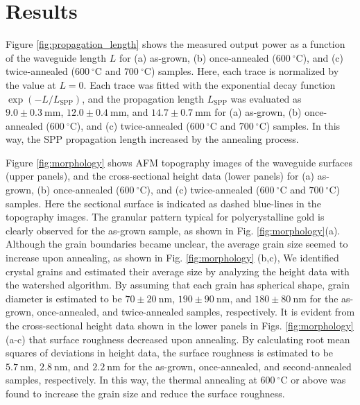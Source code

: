 \documentclass[aip,apl,reprint]{revtex4-1}
\begin{document}
\section{Results}
\label{sec:result}
Figure \ref{fig:propagation_length} shows the measured output power as a function of the waveguide length $L$ for (a) as-grown, (b) once-annealed ($600\:^\circ\mathrm{C}$), and (c) twice-annealed ($600\:^\circ\mathrm{C}$ and $700\:^\circ\mathrm{C}$) samples.
Here, each trace is normalized by the value at $L=0$.
Each trace was fitted with the exponential decay function $\exp(-L/L_{\mathrm{SPP}})$, and the propagation length $L_{\mathrm{SPP}}$ was evaluated as $9.0\pm0.3\:\mathrm{mm}$, $12.0\pm0.4\:\mathrm{mm}$, and $14.7\pm0.7\:\mathrm{mm}$ for (a) as-grown, (b) once-annealed ($600\:^\circ\mathrm{C}$), and (c) twice-annealed ($600\:^\circ\mathrm{C}$ and $700\:^\circ\mathrm{C}$) samples.
In this way, the SPP propagation length increased by the annealing process.

Figure \ref{fig:morphology} shows AFM topography images of the waveguide surfaces (upper panels), and the cross-sectional height data (lower panels) for (a) as-grown, (b) once-annealed ($600\:^\circ\mathrm{C}$), and (c) twice-annealed ($600\:^\circ\mathrm{C}$ and $700\:^\circ\mathrm{C}$) samples. Here the sectional surface is indicated as dashed blue-lines in the topography images. The granular pattern typical for polycrystalline gold is clearly observed for the as-grown sample, as shown in Fig. \ref{fig:morphology}(a). Although the grain boundaries became unclear, the average grain size seemed to increase upon annealing, as shown in Fig. \ref{fig:morphology} (b,c),  We identified crystal grains and estimated their average size by analyzing the height data with the watershed algorithm\cite{Petr}. By assuming that each grain has spherical shape, grain diameter is estimated to be $70\pm20\:\mathrm{nm}$, $190\pm90\:\mathrm{nm}$, and $180\pm80\:\mathrm{nm}$ for the as-grown, once-annealed, and twice-annealed samples, respectively. It is evident from the cross-sectional height data shown in the lower panels in Figs. \ref{fig:morphology} (a-c) that surface roughness decreased upon annealing. By calculating root mean squares of deviations in height data, the surface roughness is estimated to be $5.7\:\mathrm{nm}$, $2.8\:\mathrm{nm}$, and $2.2\:\mathrm{nm}$ for the as-grown, once-annealed, and second-annealed samples, respectively. In this way, the thermal annealing at $600\:^\circ\mathrm{C}$ or above was found to increase the grain size and reduce the surface roughness.
\end{document}
